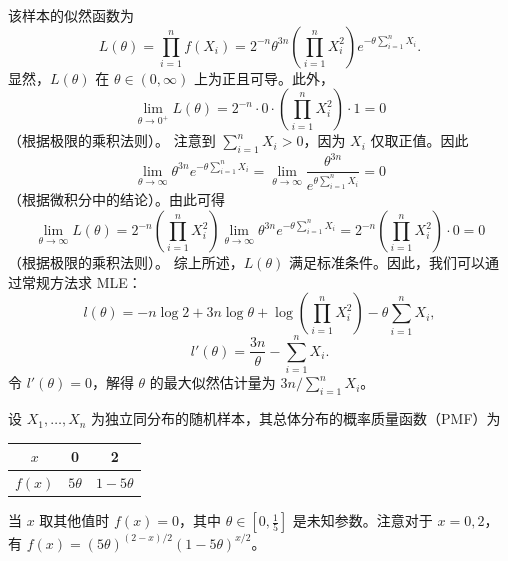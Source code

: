 \begin{questions}
\begin{solution}
该样本的似然函数为
\[
L(\theta) = \prod_{i=1}^n f(X_i) = 2^{-n}\theta^{3n} \left(\prod_{i=1}^n X_i^2\right) e^{-\theta \sum_{i=1}^n X_i}.
\]
显然，$L(\theta)$ 在 $\theta \in (0, \infty)$ 上为正且可导。此外，
\[
\lim_{\theta \to 0^+} L(\theta) = 2^{-n} \cdot 0 \cdot \left(\prod_{i=1}^n X_i^2\right) \cdot 1 = 0
\]
（根据极限的乘积法则）。
注意到 $\sum_{i=1}^n X_i > 0$，因为 $X_i$ 仅取正值。因此
\[
\lim_{\theta \to \infty} \theta^{3n}e^{-\theta \sum_{i=1}^n X_i} = \lim_{\theta \to \infty} \frac{\theta^{3n}}{e^{\theta \sum_{i=1}^n X_i}} = 0
\]
（根据微积分中的结论）。由此可得
\[
\lim_{\theta \to \infty} L(\theta) = 2^{-n} \left(\prod_{i=1}^n X_i^2\right) \lim_{\theta \to \infty} \theta^{3n}e^{-\theta \sum_{i=1}^n X_i} = 2^{-n} \left(\prod_{i=1}^n X_i^2\right) \cdot 0 = 0
\]
（根据极限的乘积法则）。
综上所述，$L(\theta)$ 满足标准条件。因此，我们可以通过常规方法求 MLE：
\[
l(\theta) = -n \log 2 + 3n \log \theta + \log \left(\prod_{i=1}^n X_i^2\right) - \theta \sum_{i=1}^n X_i,
\]
\[
l'(\theta) = \frac{3n}{\theta} - \sum_{i=1}^n X_i.
\]
令 $l'(\theta) = 0$，解得 $\theta$ 的最大似然估计量为 $3n / \sum_{i=1}^n X_i$。
\end{solution}

\question
设 $X_1, \dots, X_n$ 为独立同分布的随机样本，其总体分布的概率质量函数（PMF）为
\begin{center}
\begin{tabular}{c|c|c}
$x$ & 0 & 2 \\ \hline
$f(x)$ & $5\theta$ & $1 - 5\theta$
\end{tabular}
\end{center}
当 $x$ 取其他值时 $f(x) = 0$，其中 $\theta \in \left[0, \frac{1}{5}\right]$ 是未知参数。注意对于 $x = 0, 2$，有 $f(x) = (5\theta)^{(2-x)/2}(1 - 5\theta)^{x/2}$。
\end{questions}
